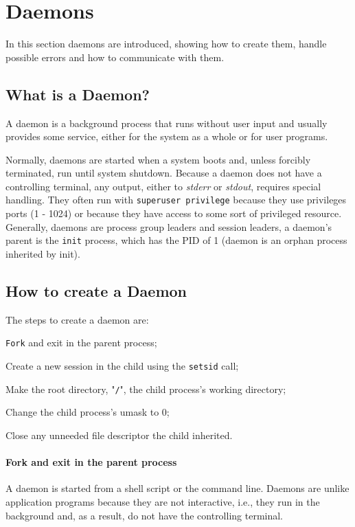 \section{Daemons}
\label{sec:daemons}
In this section daemons are introduced, showing how to create them, handle
possible errors and how to communicate with them.
%
\subsection{What is a Daemon?}
A daemon is a background process that runs without user input and usually provides some service, either for the system as a whole or for user programs.

Normally, daemons are started when a system boots and, unless forcibly terminated, run until system shutdown.
Because a daemon does not have a controlling terminal, any output,
either to \textit{stderr} or \textit{stdout}, requires special handling.
They often run with \texttt{superuser privilege} because they use privileges
ports (1 - 1024) or because they have access to some sort of privileged resource.
Generally, daemons are process group leaders and session leaders, a daemon's parent is the \texttt{init} process, which has the PID of 1 (daemon is an orphan process inherited by init).

\subsection{How to create a Daemon}
The steps to create a daemon are:
%
\begin{enum-c}
\item \texttt{Fork} and exit in the parent process;
\item Create a new session in the child using the \texttt{setsid} call;
\item Make the root directory, "\texttt{/}", the child process's working directory;
\item Change the child process's umask to 0;
\item Close any unneeded file descriptor the child inherited.
\end{enum-c}

\paragraph{\textbf{Fork and exit in the parent process}}
%
A daemon is started from a shell script or the command line.
Daemons are unlike application programs because they are not interactive, i.e., they run in the background and, as a result, do not have the controlling terminal.

